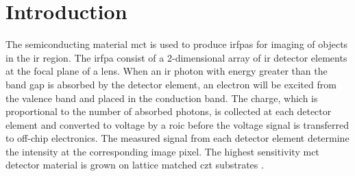 \chapter{Introduction}




The semiconducting material \ac{mct} is used to produce \acp{irfpa} for imaging of objects in the \ac{ir} region. The \ac{irfpa} consist of a 2-dimensional array of \ac{ir} detector elements at the focal plane of a lens. When an \ac{ir} photon with energy greater than the band gap is absorbed by the detector element, an electron will be excited from the valence band and placed in the conduction band. The charge, which is proportional to the number of absorbed photons, is collected at each detector element and converted to voltage by a \ac{roic} before the voltage signal is transferred to off-chip electronics. The measured signal from each detector element determine the intensity at the corresponding image pixel. The highest sensitivity \ac{mct} detector material is grown on lattice matched \ac{czt} substrates \citep{benson2016analysis}.

